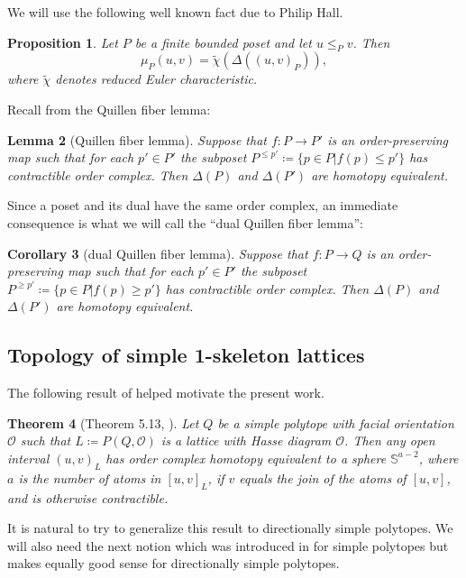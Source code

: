 \documentclass[12pt]{amsart}
\theoremstyle{plain}
\newtheorem{thm}{Theorem}[section]
\newtheorem{lem}[thm]{Lemma}
\newtheorem{cor}[thm]{Corollary}
\newtheorem{prop}[thm]{Proposition}
\theoremstyle{definition}
\theoremstyle{remark}
\renewcommand{\SS}{\mathbb{S}}
\begin{document}
We will use the following well known fact due to Philip Hall.

\begin{prop}
\label{prop:philip-hall}
Let $P$ be a finite bounded poset and let $u \leq_P v$. Then
\[
\mu_P(u,v) = \tilde{\chi }(\Delta((u,v)_P)),
\]
where $\tilde{\chi}$ denotes reduced Euler characteristic.
\end{prop}  


Recall from \cite{Qu} the Quillen fiber lemma:  

\begin{lem}[Quillen fiber lemma]
Suppose that $f:P\rightarrow P'$ is an order-preserving map such that for each $p'\in P'$ the subposet $P^{\le p'} \coloneqq \{ p\in P| f(p)\le p' \} $ has contractible order complex. Then $\Delta(P)$ and $\Delta(P')$ are homotopy equivalent.
\end{lem}

Since a poset and its dual have the same order complex, an immediate consequence is what we will call the ``dual Quillen fiber lemma'':

\begin{cor}[dual Quillen fiber lemma]
\label{cor:dual-quillen}
Suppose that $f:P\rightarrow Q$ is an order-preserving map such that for each $p'\in P'$ the subposet $P^{\ge p'} \coloneqq \{ p\in P | f(p) \ge p'\}$ has contractible order complex. Then $\Delta (P)$ and $\Delta (P')$ are homotopy equivalent.
\end{cor}

\subsection{Topology of simple 1-skeleton lattices}
The following result of \cite{He} helped motivate the present work.   

\begin{thm}[Theorem 5.13, \cite{He}]
\label{thm:simple-lattice-homotopy}
Let $Q$ be a simple polytope with facial orientation $\mathcal{O}$ such that $L \coloneqq P(Q,\mathcal{O})$ is a lattice with Hasse diagram $\mathcal{O}$. Then any open interval $(u,v)_L$ has order complex homotopy equivalent to a sphere $\SS^{a-2}$, where $a$ is the number of atoms in $[u,v]_L$, if $v$ equals the join of the atoms of $[u,v]$, and is otherwise contractible.
\end{thm} 

It is natural to try to generalize this result to directionally simple polytopes.
We will also need the next notion which was introduced in  \cite{He} for simple polytopes but makes equally good sense for directionally simple polytopes.  
\end{document}
